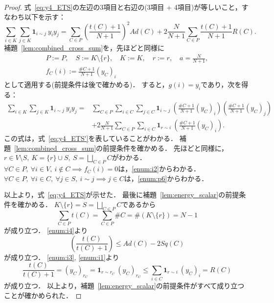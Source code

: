 \begin{proof}
  式~\eqref{eq:y4_ETS}の左辺の3項目と右辺の(3項目 + 4項目)が等しいこと，すなわち以下を示す：
  \begin{equation} \label{eq:y4_ETS'}
    \sum_{i \in K} \sum_{j \in K} \bm{1}_{i \sim j}\ y_i y_j
    = \sum_{C \in P} \left( \frac{t(C) + 1}{N + 1} \right) ^ 2 Ad(C) + 2 \frac{N}{N + 1} \sum_{C \in P} \frac{t(C) + 1}{N + 1} R(C).
  \end{equation}
  補題~\ref{lem:combined_cross_sum}を，先ほどと同様に
  \begin{gather}
    P := P,\quad S := K \setminus \{r\},\quad K := K,\quad r := r,\quad a = \frac{N}{N + 1}, \\
    f_C(i) := \frac{\# C + 1}{N + 1} (y_C)_i
  \end{gather}
  として適用する(前提条件は後で確かめる)．
  すると，$g(i) = y_i$であり，次を得る：
  \begin{equation}
    \begin{split}
      \sum_{i \in K} \sum_{j \in K} \bm{1}_{i \sim j}\ y_i y_j
    = & \sum_{C \in P} \sum_{i \in C} \sum_{j \in C} \bm{1}_{i \sim j}\ \left( \frac{\# C + 1}{N + 1} (y_C)_i \right) \left( \frac{\# C + 1}{N + 1} (y_C)_j \right) \\
    & + 2 \frac{N}{N + 1} \sum_{C \in P} \sum_{i \in C} \bm{1}_{r \sim i}\ \left( \frac{\# C + 1}{N + 1} (y_C)_i \right).
    \end{split}
  \end{equation}
  この式は，式~\eqref{eq:y4_ETS'}を表していることがわかる．
  補題~\ref{lem:combined_cross_sum}の前提条件を確かめる．
  先ほどと同様に，$r \in V \setminus S,\ K = \{r\} \cup S,\ S = \displaystyle \bigsqcup_{C \in P} C$がわかる．
  $\forall C \in P,\ \forall i \in V,\ i \notin C \implies f_C(i) = 0$は，\ref{enum:i2}からわかる．
  $\forall C \in P,\ \forall i \in C,\ \forall j \in S,\ i \sim j \implies j \in C$は，\ref{enum:p6}からわかる．

  以上より，式~\eqref{eq:y4_ETS}が示せた．
  最後に補題~\ref{lem:energy_scalar}の前提条件を確かめる．
  $K \setminus \{r\} = S = \displaystyle \bigsqcup_{C \in P} C$であるから
  \begin{equation}
    \sum_{C \in P} t(C)
    = \sum_{C \in P} \# C
    = \# (K \setminus \{r\})
    = N - 1
  \end{equation}
  が成り立つ．
  \ref{enum:i4}より
  \begin{equation}
    \left(\dfrac{t(C)}{t(C) + 1}\right) \le Ad(C) - 2 Sq(C)
  \end{equation}
  が成り立つ．
  \ref{enum:i3}, \ref{enum:i1}より
  \begin{equation}
    \frac{t(C)}{t(C) + 1}
    = (y_C)_{r_C}
    = \bm{1}_{r \sim r_C}\ (y_C)_{r_C}
    \le \sum_{i \in C} \bm{1}_{r \sim i}\ (y_C)_i
    = R(C)
  \end{equation}
  が成り立つ．
  以上より，補題~\ref{lem:energy_scalar}の前提条件がすべて成り立つことが確かめられた．
\end{proof}